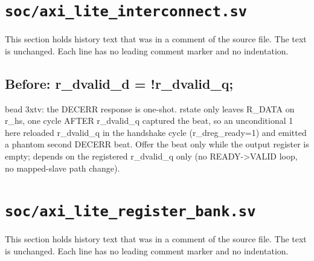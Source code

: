 \section{\texttt{soc/axi\_lite\_interconnect.sv}}\label{cr:mod:axi-lite-interconnect}

This section holds history text that was in a comment of the source file. The text is unchanged. Each line has no leading comment marker and no indentation.

\begin{record}

\subsection*{Before: r\_dvalid\_d = !r\_dvalid\_q;}

\begin{textblock}
bead 3xtv: the DECERR response is one-shot.  rstate only
leaves R_DATA on r_hs, one cycle AFTER r_dvalid_q captured
the beat, so an unconditional 1 here reloaded r_dvalid_q in
the handshake cycle (r_dreg_ready=1) and emitted a phantom
second DECERR beat.  Offer the beat only while the output
register is empty; depends on the registered r_dvalid_q
only (no READY->VALID loop, no mapped-slave path change).
\end{textblock}

\end{record}

\section{\texttt{soc/axi\_lite\_register\_bank.sv}}\label{cr:mod:axi-lite-register-bank}

This section holds history text that was in a comment of the source file. The text is unchanged. Each line has no leading comment marker and no indentation.

